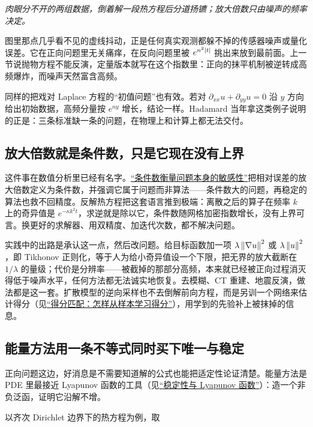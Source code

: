 \emph{肉眼分不开的两组数据，倒着解一段热方程后分道扬镳；放大倍数只由噪声的频率决定。}

图里那点几乎看不见的虚线抖动，正是任何真实观测都躲不掉的传感器噪声或量化误差。它在正向问题里无关痛痒，在反向问题里被 \(e^{n^2\left|t\right|}\) 挑出来放到最前面。上一节说抛物方程不能反演，定量版本就写在这个指数里：正向的抹平机制被逆转成高频爆炸，而噪声天然富含高频。

同样的把戏对 Laplace 方程的``初值问题''也有效。若对 \(\partial_{xx}u+\partial_{yy}u=0\) 沿 \(y\) 方向给出初始数据，高频分量按 \(e^{ny}\) 增长，结论一样。Hadamard 当年拿这类例子说明的正是：三条标准缺一条的问题，在物理上和计算上都无法交付。

\subsection{放大倍数就是条件数，只是它现在没有上界}

这件事在数值分析里已经有名字。\hyperref[sec:08-Numerical-Analysis/01-Floating-Point-and-Error/03]{``条件数衡量问题本身的敏感性''}把相对误差的放大倍数定义为条件数，并强调它属于问题而非算法——条件数大的问题，再稳定的算法也救不回精度。反解热方程把这套语言推到极端：离散之后的算子在频率 \(k\) 上的奇异值是 \(e^{-\kappa k^2t}\)，求逆就是除以它，条件数随网格加密指数增长，没有上界可言。换更好的求解器、用双精度、加迭代次数，都不解决问题。

实践中的出路是承认这一点，然后改问题。给目标函数加一项 \(\lambda\left\lVert\nabla u\right\rVert^2\) 或 \(\lambda\left\lVert u\right\rVert^2\)，即 Tikhonov 正则化，等于人为给小奇异值设一个下限，把无界的放大截断在 \(1/\lambda\) 的量级；代价是分辨率——被截掉的那部分高频，本来就已经被正向过程消灭得低于噪声水平，任何方法都无法诚实地恢复。去模糊、CT 重建、地震反演，做法都是这一套。扩散模型的逆向采样也不去倒解前向方程，而是另训一个网络来估计得分（见\hyperref[sec:06-Random-Processes/06-Diffusion-and-SDE/05]{``得分匹配：怎样从样本学习得分''}），用学到的先验补上被抹掉的信息。

\subsection{能量方法用一条不等式同时买下唯一与稳定}

正向问题这边，好消息是不需要知道解的公式也能把适定性论证清楚。能量方法是 PDE 里最接近 Lyapunov 函数的工具（见\hyperref[sec:15-Differential-Equations-and-Dynamical-Systems/02-Stability-and-Dynamical-Systems/02]{``稳定性与 Lyapunov 函数''}）：造一个非负泛函，证明它沿解不增。

以齐次 Dirichlet 边界下的热方程为例，取

